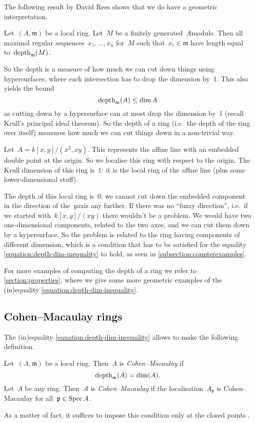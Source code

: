\documentclass[10pt,a4paper]{article}
\begin{document}
The following result by David Rees shows that we do have a geometric interpretation.
\begin{theorem}
  Let~$(A,\mathfrak{m})$ be a local ring. Let~$M$ be a finitely generated~$A$\dash module. Then all maximal regular sequences~$x_1,\dotsc,x_n$ for~$M$ such that~$x_i\in\mathfrak{m}$ have length equal to~$\operatorname{depth}_{\mathfrak{m}}(M)$.
\end{theorem}
So the depth is a measure of how much we can cut down things using hypersurfaces, where each intersection has to drop the dimension by~1. This also yields the bound
\begin{equation}
  \label{equation:depth-dim-inequality}
  \operatorname{depth}_{\mathfrak{m}}(A)\leq\dim A
\end{equation}
as cutting down by a hypersurface can at most drop the dimension by~1 (recall Krull's principal ideal theorem). So the depth of a ring (i.e.\ the depth of the ring over itself) measures how much we can cut things down in a non-trivial way.

\begin{example}
  Let~$A=k[x,y]/(x^2,xy)$. This represents the affine line with an embedded double point at the origin. So we localise this ring with respect to the origin. The Krull dimension of this ring is~$1$: it is the local ring of the affine line (plus some lower-dimensional stuff).
  
  The depth of this local ring is~$0$: we cannot cut down the embedded component in the direction of the~$y$\dash axis any further. If there was no ``fuzzy direction'', i.e.\ if we started with~$k[x,y]/(xy)$ there wouldn't be a problem. We would have two one-dimensional components, related to the two axes, and we can cut them down by a hypersurface. So the problem is related to the ring having components of different dimension, which is a condition that has to be satisfied for the equality \eqref{equation:depth-dim-inequality} to hold, as seen in \cref{subsection:counterexamples}.
\end{example}

For more examples of computing the depth of a ring we refer to \cref{section:properties}, where we give some more geometric examples of the (in)equality \eqref{equation:depth-dim-inequality}.


\subsection{Cohen--Macaulay rings}
The (in)equality \eqref{equation:depth-dim-inequality} allows to make the following definition.
\begin{definition}
  Let~$(A,\mathfrak{m})$ be a local ring. Then~$A$ is \emph{Cohen--Macaulay} if
  \begin{equation}
    \operatorname{depth}_{\mathfrak{m}}(A)=\dim(A).
  \end{equation}
  Let~$A$ be any ring. Then~$\mathcal{A}$ is \emph{Cohen--Macaulay} if the localisation~$A_{\mathfrak{p}}$ is Cohen--Macaulay for all~$\mathfrak{p}\in\operatorname{Spec} A$.
\end{definition}
As a matter of fact, it suffices to impose this condition only at the closed points \cite[proposition 18.8]{eisenbud-commutative-algebra}.
\end{document}
